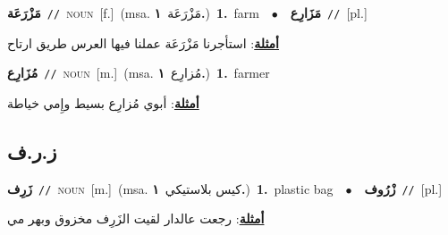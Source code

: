 \documentclass[10pt,a4paper,twoside]{article} %
\begin{document}
\begin{multicols}{2}
{\setlength\topsep{0pt}\textbf{\foreignlanguage{arabic}{مَزْرَعَة}}\ {\color{gray}\texttt{//}\color{black}}\ \textsc{noun}\ [f.]\ \color{gray}(msa. \foreignlanguage{arabic}{مَزْرَعَة}~\foreignlanguage{arabic}{\textbf{١.}})\color{black}\ \textbf{1.}~farm\ \ $\bullet$\ \ \setlength\topsep{0pt}\textbf{\foreignlanguage{arabic}{مَزَارِع}}\ {\color{gray}\texttt{//}\color{black}}\ [pl.]\  \begin{flushright}\color{gray}\foreignlanguage{arabic}{\textbf{\underline{\foreignlanguage{arabic}{أمثلة}}}: استأجرنا مَزْرَعَة عملنا فيها العرس طريق ارتاح}\end{flushright}\color{black}} \vspace{2mm}

{\setlength\topsep{0pt}\textbf{\foreignlanguage{arabic}{مُزَارِع}}\ {\color{gray}\texttt{//}\color{black}}\ \textsc{noun}\ [m.]\ \color{gray}(msa. \foreignlanguage{arabic}{مُزارِع}~\foreignlanguage{arabic}{\textbf{١.}})\color{black}\ \textbf{1.}~farmer\  \begin{flushright}\color{gray}\foreignlanguage{arabic}{\textbf{\underline{\foreignlanguage{arabic}{أمثلة}}}: أبوي مُزارِع بسيط وإِمي خياطة}\end{flushright}\color{black}} \vspace{2mm}

\vspace{-3mm}
\subsection*{\color{blue}\foreignlanguage{arabic}{ز.ر.ف}\color{blue}{}} 

{\setlength\topsep{0pt}\textbf{\foreignlanguage{arabic}{زَرِف}}\ {\color{gray}\texttt{//}\color{black}}\ \textsc{noun}\ [m.]\ \color{gray}(msa. \foreignlanguage{arabic}{كيس بلاستيكي}~\foreignlanguage{arabic}{\textbf{١.}})\color{black}\ \textbf{1.}~plastic bag\ \ $\bullet$\ \ \setlength\topsep{0pt}\textbf{\foreignlanguage{arabic}{زْرُوف}}\ {\color{gray}\texttt{//}\color{black}}\ [pl.]\  \begin{flushright}\color{gray}\foreignlanguage{arabic}{\textbf{\underline{\foreignlanguage{arabic}{أمثلة}}}: رجعت عالدار لقيت الزَرِف مخزوق وبهر مي}\end{flushright}\color{black}} \vspace{2mm}


\end{multicols}
\end{document}
